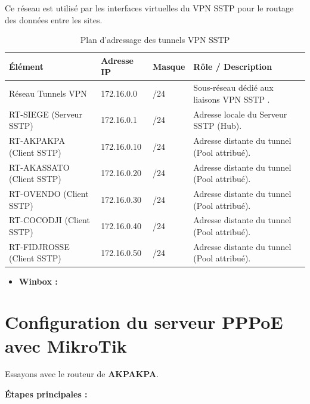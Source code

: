 Ce réseau est utilisé par les interfaces virtuelles du \gls{VPN} \gls{SSTP} pour le routage des
données entre les sites.
\begin{table}[H]
\centering
\caption{Plan d’adressage des tunnels VPN SSTP}
\label{tab:adressage_sstp}
\renewcommand{\arraystretch}{1.4}
\begin{tabular}{|p{4cm}|p{4cm}|p{3cm}|p{5cm}|}
\hline
\textbf{Élément} & \textbf{Adresse \gls{IP}} & \textbf{Masque} & \textbf{Rôle / Description} \\
\hline
Réseau Tunnels \gls{VPN} & 172.16.0.0 & /24 &
Sous-réseau dédié aux liaisons \gls{VPN} \gls{SSTP} . \\
\hline
RT-SIEGE (Serveur \gls{SSTP}) & 172.16.0.1 & /24 &
Adresse locale du Serveur \gls{SSTP} (Hub). \\
\hline
RT-AKPAKPA (Client \gls{SSTP}) & 172.16.0.10 & /24 &
Adresse distante du tunnel (Pool attribué). \\
\hline
RT-AKASSATO (Client \gls{SSTP}) & 172.16.0.20 & /24 &
Adresse distante du tunnel (Pool attribué). \\
\hline
RT-OVENDO (Client \gls{SSTP}) & 172.16.0.30 & /24 &
Adresse distante du tunnel (Pool attribué). \\
\hline
RT-COCODJI (Client \gls{SSTP}) & 172.16.0.40 & /24 &
Adresse distante du tunnel (Pool attribué). \\
\hline
RT-FIDJROSSE (Client \gls{SSTP}) & 172.16.0.50 & /24 &
Adresse distante du tunnel (Pool attribué). \\
\hline
\end{tabular}
\end{table}
\begin{itemize}
\item \textbf{Winbox :}
\end{itemize}
\section{Configuration du serveur PPPoE avec MikroTik \cite{mikrotik-pppoe}}

Essayons avec le routeur de \textbf{AKPAKPA}.

\textbf{Étapes principales :}

